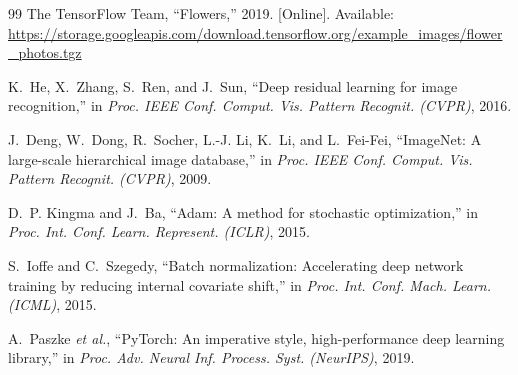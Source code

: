 \documentclass[journal]{IEEEtran}
\begin{document}
\begin{thebibliography}{99}
The TensorFlow Team, ``Flowers,'' 2019. [Online]. Available: \url{https://storage.googleapis.com/download.tensorflow.org/example_images/flower_photos.tgz}

K.~He, X.~Zhang, S.~Ren, and J.~Sun, ``Deep residual learning for image recognition,'' in \textit{Proc. IEEE Conf. Comput. Vis. Pattern Recognit. (CVPR)}, 2016.

J.~Deng, W.~Dong, R.~Socher, L.-J. Li, K.~Li, and L.~Fei-Fei, ``ImageNet: A large-scale hierarchical image database,'' in \textit{Proc. IEEE Conf. Comput. Vis. Pattern Recognit. (CVPR)}, 2009.

D.~P. Kingma and J.~Ba, ``Adam: A method for stochastic optimization,'' in \textit{Proc. Int. Conf. Learn. Represent. (ICLR)}, 2015.

S.~Ioffe and C.~Szegedy, ``Batch normalization: Accelerating deep network training by reducing internal covariate shift,'' in \textit{Proc. Int. Conf. Mach. Learn. (ICML)}, 2015.

A.~Paszke \textit{et al.}, ``PyTorch: An imperative style, high-performance deep learning library,'' in \textit{Proc. Adv. Neural Inf. Process. Syst. (NeurIPS)}, 2019.

\end{thebibliography}
\end{document}
